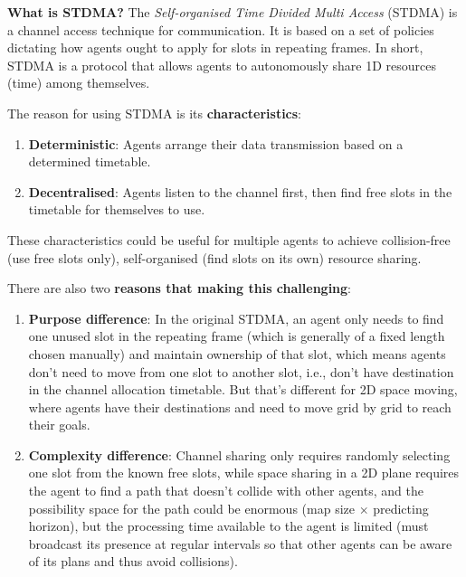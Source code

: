 \label{sec:Why STDMA?}

\textbf{What is STDMA?} The \textit{Self-organised Time Divided Multi Access} (STDMA)
 is a channel access technique for communication. 
 It is based on a set of policies dictating how agents ought to apply for
  slots in repeating frames. 
  In short, STDMA is a protocol that allows agents to autonomously
   share 1D resources (time) among themselves.


The reason for using STDMA is its \textbf{characteristics}:

\begin{enumerate}
    \item \textbf{Deterministic}: Agents arrange their data transmission based on a determined timetable.
    \item \textbf{Decentralised}: Agents listen to the channel first, then find free slots in the timetable for themselves to use.
\end{enumerate}

These characteristics could be useful for multiple agents to achieve collision-free (use free slots only),
 self-organised (find slots on its own) resource sharing.

There are also two \textbf{reasons that making this challenging}: 

\begin{enumerate}
    \item \textbf{Purpose difference}: In the original STDMA, an agent only needs to find one unused slot
    in the repeating frame (which is generally of a fixed length chosen manually) and maintain ownership of that slot,
    which means agents don't need to move from one slot to another slot, i.e., don't have destination in the channel allocation timetable. 
    But that's different for 2D space moving, where agents have their destinations and need to move grid by grid to reach their goals.
    \item \textbf{Complexity difference}: Channel sharing only requires randomly selecting one slot from the known free slots, while space sharing in
     a 2D plane requires the agent to find a path that doesn't collide with other agents, and the possibility space for the path could be enormous
      (map size $\times$ predicting horizon), but the processing time available to the agent is limited
       (must broadcast its presence at regular intervals so that other agents can be aware of its plans and thus avoid collisions).
\end{enumerate}


